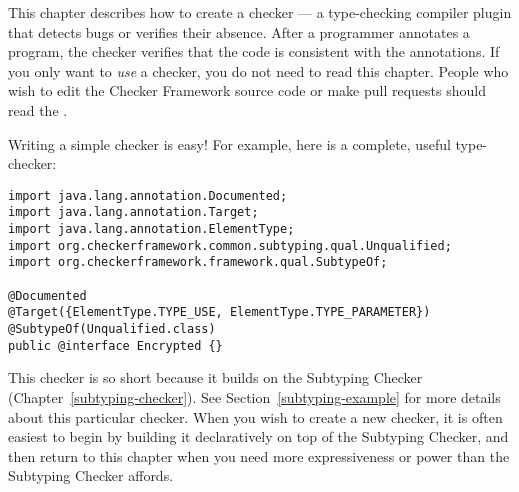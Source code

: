\htmlhr
{}
\label{writing-a-checker} %

\newcommand{\TreeAPIBase}{https://docs.oracle.com/en/java/javase/11/docs/api/jdk.compiler/com/sun/source}
\newcommand{\refTreeclass}[2]{\href{\TreeAPIBase{}/#1/#2.html?is-external=true}{\<#2>}}
\newcommand{\ModelAPIBase}{https://docs.oracle.com/en/java/javase/11/docs/api/java.compiler/javax/lang/model}
\newcommand{\refModelclass}[2]{\href{\ModelAPIBase{}/#1/#2.html?is-external=true}{\<#2>}}

This chapter describes how to create a checker
--- a type-checking compiler plugin that detects bugs or verifies their
absence.  After a programmer annotates a program,
the checker verifies that the code is consistent
with the annotations.
If you only want to \emph{use} a checker, you do not need to read this
chapter.
People who wish to edit the Checker Framework source code or
make pull requests should read the
.


Writing a simple checker is easy!  For example, here is a complete, useful
type-checker:

\begin{Verbatim}
import java.lang.annotation.Documented;
import java.lang.annotation.Target;
import java.lang.annotation.ElementType;
import org.checkerframework.common.subtyping.qual.Unqualified;
import org.checkerframework.framework.qual.SubtypeOf;

@Documented
@Target({ElementType.TYPE_USE, ElementType.TYPE_PARAMETER})
@SubtypeOf(Unqualified.class)
public @interface Encrypted {}
\end{Verbatim}

This checker is so short because it builds on the Subtyping Checker
(Chapter~\ref{subtyping-checker}).
See Section~\ref{subtyping-example} for more details about this particular checker.
When you wish to create a new checker, it is often easiest to begin by
building it declaratively on top of the Subtyping Checker, and then return to
this chapter when you need more expressiveness or power than the Subtyping
Checker affords.

